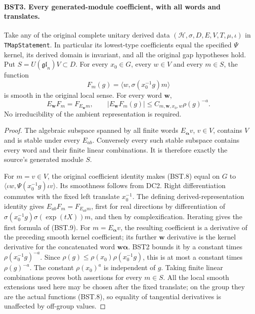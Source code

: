 \paragraph{BST3. Every generated-module coefficient, with all words and translates.}
\label{claim:BST3}
Take any of the original complete unitary derived data
$(\mathcal H,\sigma,D,E,V,T,\mu,\iota)$ in
\texttt{TMapStatement}.  In particular its lowest-type coefficients
equal the specified $\Psi$ kernel, its derived domain is invariant,
and all the original gap hypotheses hold.
Put $S=U(\mathfrak{gl}_n)V\subset D$.
For every $x_0\in G$, every $w\in V$ and every $m\in S$, the
function
\[
 F_m(g)=\langle w,\sigma(x_0^{-1}g)m\rangle
 \tag{BST.8}
\]
is smooth in the original local sense.  For every word $\mathbf w$,
\[
 E_{\mathbf w}F_m=F_{E_{\mathbf w}m},\qquad
 |E_{\mathbf w}F_m(g)|\le C_{m,\mathbf w,x_0,w}\rho(g)^{-a}.
 \tag{BST.9}
\]
No irreducibility of the ambient representation is required.

\begin{proof}
The algebraic subspace spanned by all finite words $E_{\boldsymbol\alpha}v$,
$v\in V$, contains $V$ and is stable under every $E_{ab}$.
Conversely every such stable subspace contains every word and their
finite linear combinations.  It is therefore exactly the source's
generated module $S$.

For $m=v\in V$, the original coefficient identity makes (BST.8)
equal on $G$ to
$\langle\iota w,\Psi(x_0^{-1}g)\iota v\rangle$.
Its smoothness follows from DC2.  Right differentiation commutes with
the fixed left translate $x_0^{-1}$.
The defining derived-representation identity gives
$E_{ab}F_m=F_{E_{ab}m}$, first for real directions by differentiation
of $\sigma(x_0^{-1}g)\sigma(\exp(tX))m$, and then by complexification.
Iterating gives the first formula of (BST.9).
For $m=E_{\boldsymbol\alpha}v$, the resulting coefficient is a
derivative of the preceding smooth kernel coefficient; its further
$\mathbf w$ derivative is the kernel derivative for the concatenated
word $\mathbf w\boldsymbol\alpha$.
BST2 bounds it by a constant times $\rho(x_0^{-1}g)^{-a}$.
Since $\rho(g)\le\rho(x_0)\rho(x_0^{-1}g)$, this is at most a
constant times $\rho(g)^{-a}$.  The constant $\rho(x_0)^a$ is
independent of $g$.
Taking finite linear combinations proves both assertions for every
$m\in S$.  All the local smooth extensions used here may be chosen
after the fixed translate; on the group they are the actual functions
(BST.8), so equality of tangential derivatives is unaffected by
off-group values.
\end{proof}

